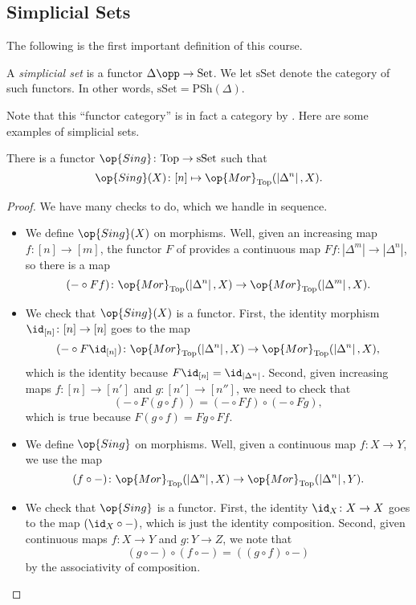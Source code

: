 \documentclass[../notes.tex]{subfiles}
\begin{document}
\subsection{Simplicial Sets}
The following is the first important definition of this course.
\begin{definition}
	A \textit{simplicial set} is a functor $\Delta\opp\to\mathrm{Set}$. We let $\mathrm{sSet}$ denote the category of such functors. In other words, $\mathrm{sSet}=\mathrm{PSh}(\Delta)$.
\end{definition}
Note that this ``functor category'' is in fact a category by . Here are some examples of simplicial sets.
\begin{example}[$\op{Sing}(X)$] \label{ex:sing-is-sset}
	There is a functor $\op{Sing}\colon\mathrm{Top}\to\mathrm{sSet}$ such that
	\[\op{Sing}(X)\colon[n]\mapsto\op{Mor}_{\mathrm{Top}}(\left|\Delta^n\right|,X).\]
\end{example}
\begin{proof}
	We have many checks to do, which we handle in sequence.
	\begin{itemize}
		\item We define $\op{Sing}(X)$ on morphisms. Well, given an increasing map $f\colon[n]\to[m]$, the functor $F$ of  provides a continuous map $Ff\colon\left|\Delta^m\right|\to\left|\Delta^n\right|$, so there is a map
		\[(-\circ Ff)\colon\op{Mor}_{\mathrm{Top}}(\left|\Delta^n\right|,X)\to\op{Mor}_{\mathrm{Top}}(\left|\Delta^m\right|,X).\]
		\item We check that $\op{Sing}(X)$ is a functor. First, the identity morphism $\id_{[n]}\colon[n]\to[n]$ goes to the map
		\[(-\circ F{\id_{[n]}})\colon\op{Mor}_{\mathrm{Top}}(\left|\Delta^n\right|,X)\to\op{Mor}_{\mathrm{Top}}(\left|\Delta^n\right|,X),\]
		which is the identity because $F{\id_{[n]}}=\id_{\left|\Delta^n\right|}$. Second, given increasing maps $f\colon[n]\to[n']$ and $g\colon[n']\to[n'']$, we need to check that
		\[(-\circ F(g\circ f))=(-\circ Ff)\circ(-\circ Fg),\]
		which is true because $F(g\circ f)=Fg\circ Ff$.
		\item We define $\op{Sing}$ on morphisms. Well, given a continuous map $f\colon X\to Y$, we use the map
		\[(f\circ-)\colon\op{Mor}_{\mathrm{Top}}(\left|\Delta^n\right|,X)\to\op{Mor}_{\mathrm{Top}}(\left|\Delta^n\right|,Y).\]
		\item We check that $\op{Sing}$ is a functor. First, the identity $\id_X\colon X\to X$ goes to the map $({\id_X}\circ-)$, which is just the identity composition. Second, given continuous maps $f\colon X\to Y$ and $g\colon Y\to Z$, we note that
		\[(g\circ-)\circ(f\circ-)=((g\circ f)\circ-)\]
		by the associativity of composition.
		\qedhere
	\end{itemize}
\end{proof}
\end{document}
